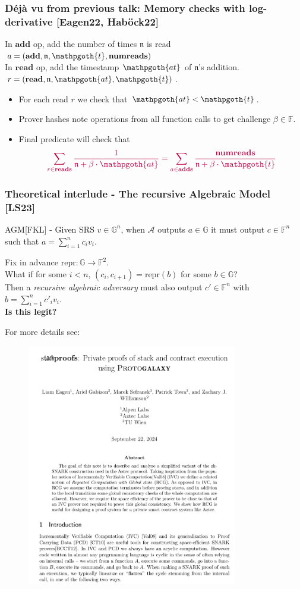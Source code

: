 \documentclass[shadesubsections,compress,14pt,mathserif]{beamer}
\newcommand{\adv}{\ensuremath{\mathcal A}}
\newcommand{\F}{\ensuremath{{\mathbb F}}}
\newcommand{\G}{\ensuremath{{\mathbb G}}}
\newcommand{\nl}{\\ \pause \vspace{0.2in}}
\newcommand{\repr}{\ensuremath{\mathrm{repr} }}
\newcommand{\numreads}{\ensuremath{\mathbf{numreads} }}
\newcommand{\add}{\ensuremath{\mathbf{add} }}
\newcommand{\adds}{\ensuremath{\mathbf{adds} }}
\newcommand{\cnt}{\ensuremath{\mathpgoth{t} }}
\newcommand{\addcount}{\ensuremath{\mathpgoth{at} }}
\renewcommand{\read}{\ensuremath{\mathbf{read} }}
\newcommand{\reads}{\ensuremath{\mathbf{reads} }}
\renewcommand{\note}{\ensuremath{\mathfrak{n} }}
\begin{document}
\begin{frame}
\frametitle{ D\'ej\`a vu from previous talk: Memory checks with log-derivative {\small [Eagen22, Hab{\"{o}}ck22]}}
In $\add$ op, add the number of times $\note$ is read
 $a=(\add,\note,\cnt,\numreads)$\nl
In $\read$ op, add the timestamp $\addcount$ of $\note$'s addition.
 $r=(\read,\note,\addcount,\cnt)$.\nl

\begin{itemize}
 \item For each read $r$ we check that $\addcount<\cnt$.\pause
 \item Prover hashes note operations from all function calls to get challenge $\beta\in \F$.\pause
 \item Final predicate will check that
 \[\textcolor{darkred}{\sum_{r\in \reads} \frac{1}{\note + \beta \cdot \addcount} = \sum _{a\in \adds}\frac{\numreads}{\note+\beta \cdot \cnt}} \]
\end{itemize}

\end{frame}
\begin{frame}
 \frametitle{Theoretical interlude - The recursive Algebraic Model {\small [LS23]}}
 AGM{\small [FKL]} - Given SRS $v\in \G^n$,
 when $\adv$ outputs $a\in \G$ it must output
 $c\in \F^n$ such that $a=\sum_{i=1}^n c_i v_i$.\nl
 
 Fix in advance $\repr:\G\to \F^2$.\nl 
 What if for some $i<n$, $(c_i,c_{i+1}) = \repr(b)$ for some $b\in \G$?\\ \pause
 Then a \emph{recursive algebraic adversary} must also output $c'\in \F^n$ with
 $b=\sum_{i=1}^n c'_i v_i$.\nl
 \textbf{Is this legit?}
\end{frame}

\begin{frame}

 For more details see:
 \begin{figure}
  \includegraphics[width=260pt]{stackproofs.png}
\end{figure}
\end{frame}
% 
\end{document}
